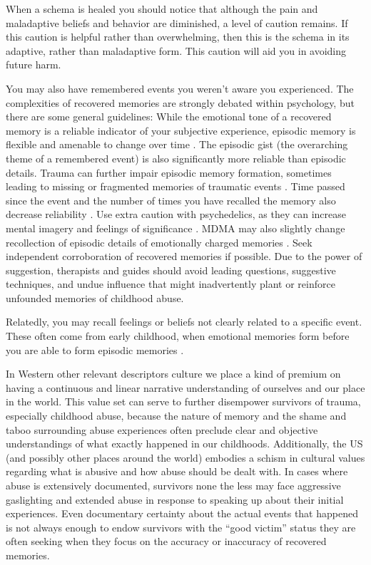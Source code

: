 \documentclass[12pt,letterpaper]{article}
\begin{document}
When a schema is healed you should notice that although the pain and maladaptive beliefs and behavior are diminished, a level of caution remains. If this caution is helpful rather than overwhelming, then this is the schema in its adaptive, rather than maladaptive form. This caution will aid you in avoiding future harm.

You may also have remembered events you weren't aware you experienced. The complexities of recovered memories are strongly debated within psychology, but there are some general guidelines: While the emotional tone of a recovered memory is a reliable indicator of your subjective experience, episodic memory is flexible and amenable to change over time \cite{reynaFuzzyTrace}. The episodic gist (the overarching theme of a remembered event) is also significantly more reliable than episodic details. Trauma can further impair episodic memory formation, sometimes leading to missing or fragmented memories of traumatic events \cite{vanderKolkBody}. Time passed since the event and the number of times you have recalled the memory also decrease reliability \cite{laneReconsolidation}. Use extra caution with psychedelics, as they can increase mental imagery and feelings of significance \cite{griffithsSignificance,araujoImagery}. MDMA may also slightly change recollection of episodic details of emotionally charged memories \cite{dossRecollection}. Seek independent corroboration of recovered memories if possible. Due to the power of suggestion, therapists and guides should avoid leading questions, suggestive techniques, and undue influence that might inadvertently plant or reinforce unfounded memories of childhood abuse.

Relatedly, you may recall feelings or beliefs not clearly related to a specific event. These often come from early childhood, when emotional memories form before you are able to form episodic memories \cite{brownAttachmentDisturbances}.

In Western {other relevant descriptors} culture we place a kind of premium on having a continuous and linear narrative understanding of ourselves and our place in the world.  This value set can serve to further disempower survivors of trauma, especially childhood abuse, because the nature of memory and the shame and taboo surrounding abuse experiences often preclude clear and objective understandings of what exactly happened in our childhoods.  Additionally, the US (and possibly other places around the world) embodies a schism in cultural values regarding what is abusive and how abuse should be dealt with. In cases where abuse is extensively documented, survivors none the less may face aggressive gaslighting and extended abuse in response to speaking up about their initial experiences. Even documentary certainty about the actual events that happened is not always enough to endow survivors with the “good victim” status they are often seeking when they focus on the accuracy or inaccuracy of recovered memories.
\end{document}
